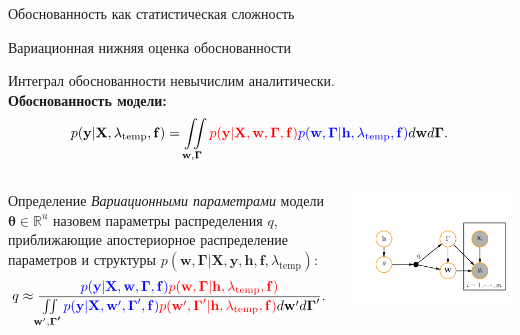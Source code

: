\documentclass[usenames,dvipsnames,11pt,pdf,utf8,russian,aspectratio=43]{beamer}
\begin{document}
\begin{frame}{Обоснованность как статистическая сложность}
\begin{figure}
\end{figure}
\end{frame}


\begin{frame}{Вариационная нижняя оценка обоснованности} 
\footnotesize

Интеграл обоснованности невычислим аналитически.\\
\textbf{Обоснованность модели:}
\[
p(\mathbf{y}|\mathbf{X}, \lambda_\text{temp},\mathbf{f}) =
 \iint\limits_{\mathbf{w}, \boldsymbol{\Gamma}}  \textcolor{red}{p(\mathbf{y}|\mathbf{X},\mathbf{w},  \boldsymbol{\Gamma}, \mathbf{f})} \textcolor{blue}{p(\mathbf{w}, \boldsymbol{\Gamma}|\mathbf{h}, \lambda_\text{temp},\mathbf{f})}d\mathbf{w}d{\boldsymbol{\Gamma}}.                         
\]

\begin{columns}
\begin{column}{0.55\textwidth}
  
\begin{block}{Определение}
\textit{Вариационными параметрами} модели $\boldsymbol{\theta} \in \mathbb{R}^{{u}}$ назовем параметры распределения $q$, приближающие апостериорное распределение параметров и структуры $p(\mathbf{w}, \boldsymbol{\Gamma}|\mathbf{X}, \mathbf{y}, \mathbf{h}, \mathbf{f}, \lambda_\text{temp})$:
\[
    q \approx  \frac{\textcolor{blue}{p(\mathbf{y}|\mathbf{X},\mathbf{w},\boldsymbol{\Gamma}, \mathbf{f})}\textcolor{red}{p(\mathbf{w}, \boldsymbol{\Gamma}|\mathbf{h}, \lambda_\text{temp},\mathbf{f})}}{\iint\limits_{\mathbf{w}', \boldsymbol{\Gamma'}}\textcolor{blue}{p(\mathbf{y}|\mathbf{X},\mathbf{w}',\boldsymbol{\Gamma}',\mathbf{f})}\textcolor{red}{p(\mathbf{w}', \boldsymbol{\Gamma}'|\mathbf{h}, \lambda_\text{temp},\mathbf{f})}d\mathbf{w}'d\boldsymbol{\Gamma}'}.
\]
\end{block} 

\end{column}
\begin{column}{0.45\textwidth}  %
    \begin{center}
     \includegraphics[width=\textwidth]{plate.pdf}
     \end{center}
\end{column}
\end{columns}




\end{frame}
\end{document}
